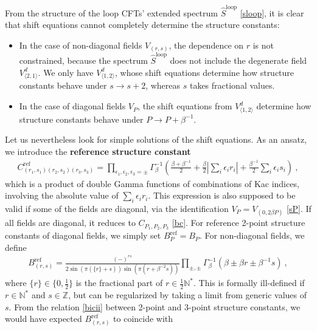 \documentclass[12pt, a4paper]{article}
\newcommand{\myindex}[1]{\textbf{\boldmath #1}}
\theoremstyle{break}
\begin{document}
From the structure of the loop CFTs' extended spectrum $\widehat{S}^\text{loop}$ \eqref{sloop}, it is clear that shift equations cannot completely determine the structure constants:
\begin{itemize}
 \item In the case of non-diagonal fields $V_{(r,s)}$, the dependence on $r$ is not constrained, because the spectrum $\widehat{S}^\text{loop}$ does not include the degenerate field $V_{\langle 2,1\rangle}^d$. We only have $V^d_{\langle 1,2\rangle}$, whose shift equations determine how structure constants behave under $s\to s+2$, whereas $s$ takes fractional values.
 \item In the case of diagonal fields $V_P$, the shift equations from $V^d_{\langle 1,2\rangle}$ determine how structure constants behave under $P\to P+\beta^{-1}$. 
\end{itemize}
Let us nevertheless look for simple solutions of the shift equations. As an ansatz, we introduce the \myindex{reference structure constant}
\begin{align}
\boxed{C^\text{ref}_{(r_1,s_1)(r_2,s_2)(r_3,s_3)} =\prod_{\epsilon_1,\epsilon_2,\epsilon_3=\pm} \Gamma_\beta^{-1} \left(\tfrac{\beta+\beta^{-1}}{2} + \tfrac{\beta}{2}\left|\textstyle{\sum_i} \epsilon_ir_i\right| + \tfrac{\beta^{-1}}{2}\textstyle{\sum_i} \epsilon_is_i\right)}\ ,
 \label{cref}
\end{align}
which is a product of double Gamma functions of combinations of Kac indices, involving the absolute value of $\sum_i\epsilon_i r_i$. 
This expression is also supposed to be valid if some of the fields are diagonal, via the identification $V_P = V_{(0,2\beta P)}$ \eqref{sP}. If all fields are diagonal, it reduces to $C_{P_1,P_2,P_3}$ \eqref{bc}. 
For reference 2-point structure constants of diagonal fields, we simply set $B^\text{ref}_P = B_P$. For non-diagonal fields, we define 
\begin{align}
 \boxed{B^\text{ref}_{(r,s)} = \frac{(-)^{rs}}{2\sin\left(\pi(\{r\}+s)\right)\sin\left(\pi(r+\beta^{-2}s)\right)}\prod_{\pm,\pm}\Gamma_\beta^{-1}\left(\beta\pm \beta r \pm \beta^{-1}s\right)} \ ,
 \label{bref}
 \end{align}
 where $\{r\}\in\{0,\frac12\}$ is the fractional part of $r\in\frac12\mathbb{N}^*$. This is formally ill-defined if $r\in\mathbb{N}^*$ and $s\in\mathbb{Z}$, but can be regularized by taking a limit from generic values of $s$. 
 From the relation \eqref{bicii} between 2-point and 3-point structure constants, we would have expected $B^\text{ref}_{(r,s)}$ to coincide with 
\end{document}

